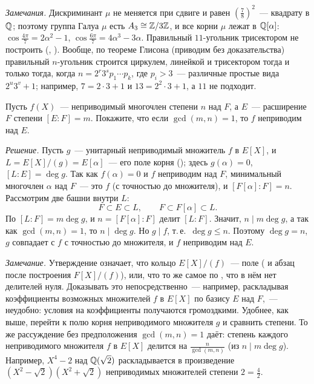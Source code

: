\emph{Замечания.} Дискриминант $\mu$ не меняется при сдвиге и равен $(\frac78)^2$~--- квадрату в $\mathbb Q$; поэтому группа Галуа
$\mu$ есть $A_3\cong\mathbb Z/3\mathbb Z$, и все корни $\mu$ лежат в $\mathbb Q[\alpha]$: $\cos\frac{4\pi}7=2\alpha^2-1$,
$\cos\frac{6\pi}7=4\alpha^3-3\alpha$. Правильный $11$-угольник трисектором не построить (, ). Вообще, по
теореме Глисона (приводим без доказательства) правильный $n$-угольник строится циркулем, линейкой и трисектором тогда
и только тогда, когда $n=2^r3^sp_1\cdots p_k$, где $p_i>3$~--- различные простые вида $2^u3^v+1$; например, $7=2\cdot3+1$ и
$13=2^2\cdot3+1$, а $11$ не подходит.

\begin{exercise}[1-5]
Пусть $f(X)$~--- неприводимый многочлен степени $n$ над $F$, а $E$~--- расширение $F$ степени $[E:F]=m$. Покажите, что
если $\gcd(m,n)=1$, то $f$ неприводим над $E$.
\end{exercise}

\noindent\emph{Решение.} Пусть $g$~--- унитарный неприводимый множитель $f$ в $E[X]$, и $L=E[X]/(g)=E[\alpha]$~--- его поле
корня (); здесь $g(\alpha)=0$, $[L:E]=\deg g$. Так как $f(\alpha)=0$ и $f$ неприводим над $F$, минимальный многочлен
$\alpha$ над $F$~--- это $f$ (с точностью до множителя), и $[F[\alpha]:F]=n$. Рассмотрим две башни внутри $L$:
\[
F\subset E\subset L,\qquad F\subset F[\alpha]\subset L .
\]
По  $[L:F]=m\deg g$, и $n=[F[\alpha]:F]$ делит $[L:F]$. Значит, $n\mid m\deg g$, а так как $\gcd(m,n)=1$, то
$n\mid\deg g$. Но $g\mid f$, т.\,е.\ $\deg g\le n$. Поэтому $\deg g=n$, $g$ совпадает с $f$ с точностью до множителя, и $f$
неприводим над $E$.

\begin{center}
\begin{keepfig}
\centering
{}
\end{keepfig}
\end{center}

\emph{Замечание.} Утверждение означает, что кольцо $E[X]/(f)$~--- поле ( и абзац после построения
$F[X]/(f)$), или, что то же самое по , что в нём нет делителей нуля. Доказывать это непосредственно~---
например, раскладывая коэффициенты возможных множителей $f$ в $E[X]$ по базису $E$ над $F$,~--- неудобно: условия на
коэффициенты получаются громоздкими. Удобнее, как выше, перейти к полю корня неприводимого множителя $g$ и сравнить
степени. То же рассуждение без предположения $\gcd(m,n)=1$ даёт: степень каждого неприводимого множителя $f$ в $E[X]$
делится на $\frac n{\gcd(m,n)}$ (из $n\mid m\deg g$). Например, $X^4-2$ над $\mathbb Q(\sqrt2)$ раскладывается в произведение
$(X^2-\sqrt2)(X^2+\sqrt2)$ неприводимых множителей степени $2=\frac42$.

